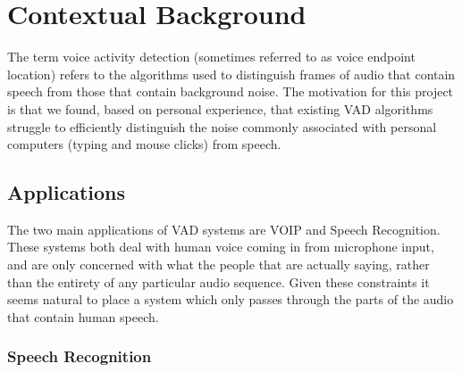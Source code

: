 \documentclass[ %
                    author={Sam Phippen},
                supervisor={Dr. Rafal Bogacz},
                     title={Real time voice activity detectors in noisy personal computing environments},
                  subtitle={},
                    degree={MEng},
                      year={2012} ]{thesis}
\begin{document}

%

\mainmatter


\chapter{Contextual Background}
\label{chap:context}

\vspace{1cm}

The term voice activity detection (sometimes referred to as voice endpoint
location\cite{Tuske}) refers to the algorithms used to distinguish frames of
audio that contain speech from those that contain background
noise\cite{ramirez}. The motivation for this project is that we found, based on
personal experience, that existing VAD algorithms struggle to efficiently
distinguish the noise commonly associated with personal computers (typing and
mouse clicks) from speech.

\section{Applications}

The two main applications of VAD systems are VOIP and Speech Recognition. These
systems both deal with human voice coming in from microphone input, and are
only concerned with what the people that are actually saying, rather than the
entirety of any particular audio sequence. Given these constraints it seems
natural to place a system which only passes through the parts of the audio that
contain human speech.

\subsection{Speech Recognition}
\end{document}
